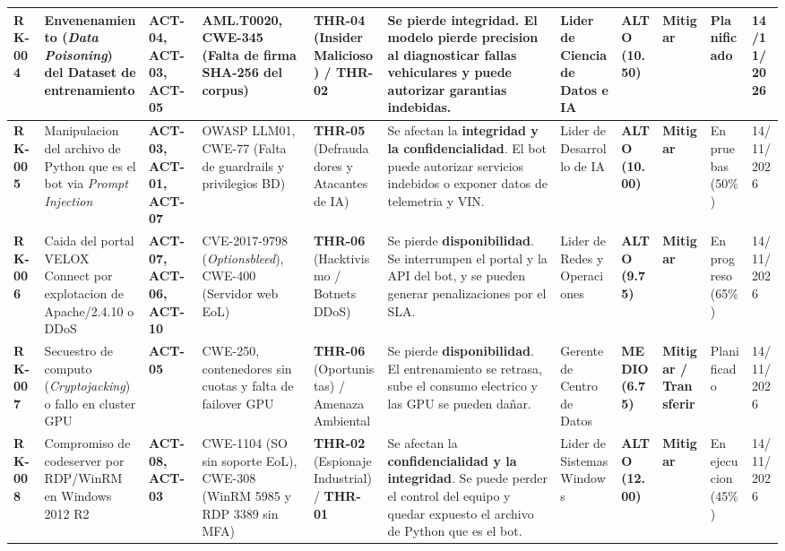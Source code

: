 \documentclass[letterpaper,11pt]{article}
\begin{document}
\begin{longtable}{|C{0.80cm}|L{1.58cm}|L{1.20cm}|L{1.92cm}|L{1.65cm}|L{1.70cm}|L{1.70cm}|C{1.35cm}|C{1.30cm}|C{1.35cm}|C{1.35cm}|}
\textbf{RK-004}
  & Envenena\-miento (\textit{Data Poisoning}) del Dataset de
entrenamiento
  & \textbf{ACT-04, ACT-03, ACT-05}
  & AML.T0020, CWE-345 (Falta de firma SHA-256 del corpus)
  & \textbf{THR-04} (Insider Malicioso) / \textbf{THR-02}
  & Se pierde \textbf{integridad}. El modelo pierde precision al
diagnosticar fallas vehiculares y puede autorizar garantias
indebidas.
  & Lider de Ciencia de Datos e IA
  & \textbf{ALTO (10.50)}
  & \textbf{Mitigar}
  & Planificado
  & 14/11/2026 \\
\hline

\textbf{RK-005}
  & Manipulacion del archivo de Python que es el bot via \textit{Prompt
Injection}
  & \textbf{ACT-03, ACT-01, ACT-07}
  & OWASP LLM01, CWE-77 (Falta de guardrails y privilegios BD)
  & \textbf{THR-05} (Defraudadores y Atacantes de IA)
  & Se afectan la \textbf{integridad y la confidencialidad}. El bot
puede autorizar servicios indebidos o exponer datos de telemetria y
VIN.
  & Lider de Desarrollo de IA
  & \textbf{ALTO (10.00)}
  & \textbf{Mitigar}
  & En pruebas (50\%)
  & 14/11/2026 \\
\hline

\textbf{RK-006}
  & Caida del portal VELOX Connect por explotacion de Apache/2.4.10 o
DDoS
  & \textbf{ACT-07, ACT-06, ACT-10}
  & CVE-2017-9798 (\textit{Optionsbleed}), CWE-400 (Servidor web EoL)
  & \textbf{THR-06} (Hacktivismo / Botnets DDoS)
  & Se pierde \textbf{disponibilidad}. Se interrumpen el portal y la
API del bot, y se pueden generar penalizaciones por el SLA.
  & Lider de Redes y Operaciones
  & \textbf{ALTO (9.75)}
  & \textbf{Mitigar}
  & En progreso (65\%)
  & 14/11/2026 \\
\hline

\textbf{RK-007}
  & Secuestro de computo (\textit{Cryptojacking}) o fallo en cluster
GPU
  & \textbf{ACT-05}
  & CWE-250, contenedores sin cuotas y falta de failover GPU
  & \textbf{THR-06} (Oportunistas) / Amenaza Ambiental
  & Se pierde \textbf{disponibilidad}. El entrenamiento se retrasa,
sube el consumo electrico y las GPU se pueden dañar.
  & Gerente de Centro de Datos
  & \textbf{MEDIO (6.75)}
  & \textbf{Mitigar / Transferir}
  & Planificado
  & 14/11/2026 \\
\hline

\textbf{RK-008}
  & Compromiso de codeserver por RDP/WinRM en Windows 2012 R2
  & \textbf{ACT-08, ACT-03}
  & CWE-1104 (SO sin soporte EoL), CWE-308 (WinRM 5985 y RDP 3389 sin
MFA)
  & \textbf{THR-02} (Espionaje Industrial) / \textbf{THR-01}
  & Se afectan la \textbf{confidencialidad y la integridad}. Se puede
perder el control del equipo y quedar expuesto el archivo de Python
que es el bot.
  & Lider de Sistemas Windows
  & \textbf{ALTO (12.00)}
  & \textbf{Mitigar}
  & En ejecucion (45\%)
  & 14/11/2026 \\
\hline


\end{longtable}
\end{document}
